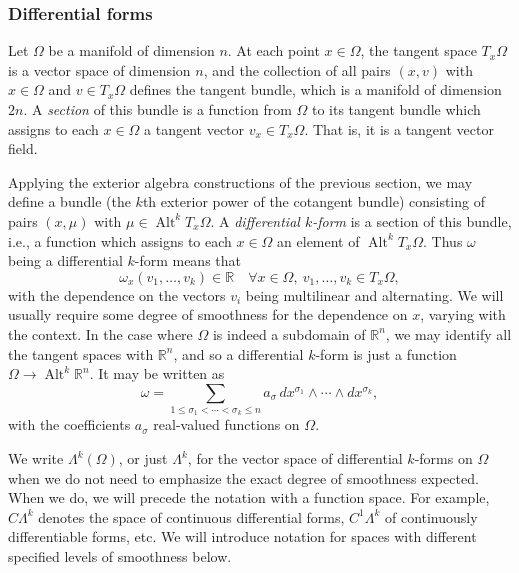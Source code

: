 \subsubsection{{Differential forms}}\label{subsec:differential-forms}

{Let $\Omega$ be a manifold of dimension $n$. At each point $x\in\Omega$, the tangent space $T_x\Omega$ is a vector space of dimension $n$, and the collection of all pairs $(x,v)$ with $x\in\Omega$ and $v\in T_x\Omega$ defines the tangent bundle, which is a manifold of dimension $2n$. A \emph{section} of this bundle is a function from $\Omega$ to its tangent bundle which assigns to each $x\in\Omega$ a tangent vector $v_x\in T_x\Omega$. That is, it is a tangent vector field.}

{Applying the exterior algebra constructions of the previous section, we may define a bundle (the $k$th exterior power of the cotangent bundle) consisting of pairs $(x,\mu)$ with $\mu\in\operatorname{Alt}^kT_x\Omega$. A \emph{differential $k$-form} is a section of this bundle, i.e., a function which assigns to each $x\in\Omega$ an element of $\operatorname{Alt}^kT_x\Omega$. Thus $\omega$ being a differential $k$-form means that}
\[
\omega_x(v_1,\ldots,v_k)\in\mathbb R\quad\forall x\in\Omega,\ v_1,\ldots,v_k\in T_x\Omega,
\]
{with the dependence on the vectors $v_i$ being multilinear and alternating. We will usually require some degree of smoothness for the dependence on $x$, varying with the context. In the case where $\Omega$ is indeed a subdomain of $\mathbb R^n$, we may identify all the tangent spaces with $\mathbb R^n$, and so a differential $k$-form is just a function $\Omega\to\operatorname{Alt}^k\mathbb R^n$. It may be written as}
\begin{equation}\label{eq:differential-form-coordinates}
\omega=\sum_{1\leq\sigma_1<\cdots<\sigma_k\leq n}a_\sigma\,dx^{\sigma_1}\wedge\cdots\wedge dx^{\sigma_k},
\end{equation}
{with the coefficients $a_\sigma$ real-valued functions on $\Omega$.}

{We write $\Lambda^k(\Omega)$, or just $\Lambda^k$, for the vector space of differential $k$-forms on $\Omega$ when we do not need to emphasize the exact degree of smoothness expected. When we do, we will precede the notation with a function space. For example, $C\Lambda^k$ denotes the space of continuous differential forms, $C^1\Lambda^k$ of continuously differentiable forms, etc. We will introduce notation for spaces with different specified levels of smoothness below.}

